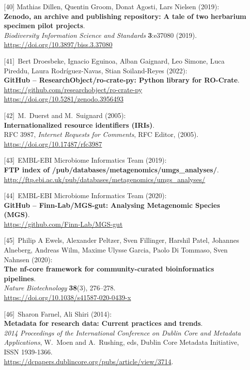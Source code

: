 {[}40{]} Mathias Dillen, Quentin Groom, Donat Agosti, Lars Nielsen
(2019):\\
\textbf{Zenodo, an archive and publishing repository: A tale of two
herbarium specimen pilot projects}.\\
\emph{Biodiversity Information Science and Standards} \textbf{3}:e37080
(2019).\\
\url{https://doi.org/10.3897/biss.3.37080}

{[}41{]}~Bert Droesbeke, Ignacio Eguinoa, Alban Gaignard, Leo Simone,
Luca Pireddu, Laura Rodríguez-Navas, Stian Soiland-Reyes (2022):\\
\textbf{GitHub -- ResearchObject/ro-crate-py: Python library for
RO-Crate}.\\
\url{https://github.com/researchobject/ro-crate-py}~\\
\url{https://doi.org/10.5281/zenodo.3956493}

{[}42{]}~M.~Duerst and M.~Suignard (2005):\\
\textbf{Internationalized resource identifiers (IRIs)}.\\
RFC 3987, \emph{Internet Requests for Comments}, RFC Editor, (2005).\\
\url{https://doi.org/10.17487/rfc3987}

{[}43{]}~EMBL-EBI Microbiome Informatics Team (2019):\\
\textbf{FTP index of /pub/databases/metagenomics/umgs\_analyses/}.\\
\url{http://ftp.ebi.ac.uk/pub/databases/metagenomics/umgs_analyses/}

{[}44{]}~EMBL-EBI Microbiome Informatics Team (2020):\\
\textbf{GitHub -- Finn-Lab/MGS-gut: Analysing Metagenomic Species
(MGS)}.\\
\url{https://github.com/Finn-Lab/MGS-gut}

{[}45{]}~Philip A Ewels, Alexander Peltzer, Sven Fillinger, Harshil
Patel, Johannes Alneberg, Andreas Wilm, Maxime Ulysse Garcia, Paolo Di
Tommaso, Sven Nahnsen (2020):\\
\textbf{The nf-core framework for community-curated bioinformatics
pipelines}.\\
\emph{Nature Biotechnology} \textbf{38}(3), 276--278.\\
\url{https://doi.org/10.1038/s41587-020-0439-x}

{[}46{]}~Sharon Farnel, Ali Shiri (2014):\\
\textbf{Metadata for research data: Current practices and trends}.\\
\emph{2014 Proceedings of the International Conference on Dublin Core
and Metadata Applications}, W.~Moen and A.~Rushing, eds, Dublin Core
Metadata Initiative, ISSN 1939-1366.\\
\url{https://dcpapers.dublincore.org/pubs/article/view/3714}.

